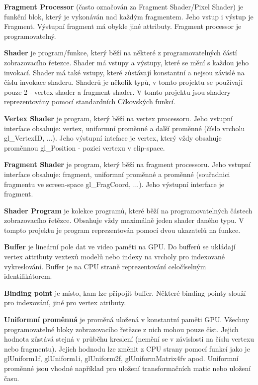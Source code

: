 {\bfseries Fragment Processor} (často označován za Fragment Shader/\-Pixel Shader) je funkční blok, který je vykonáván nad každým fragmentem. Jeho vstup i výstup je Fragment. Výstupní fragment má obykle jiné attributy. Fragment processor je programovatelný.

{\bfseries Shader} je program/funkce, který běží na některé z programovatelných částí zobrazovacího řetezce. Shader má vstupy a výstupy, které se mění s každou jeho invokací. Shader má také vstupy, které zůstávají konstantní a nejsou závislé na číslu invokace shaderu. Shaderů je několik typů, v tomto projektu se používají pouze 2 -\/ vertex shader a fragment shader. V tomto projektu jsou shadery reprezentovány pomocí standardních Cčkovských funkcí.

{\bfseries Vertex Shader} je program, který běží na vertex processoru. Jeho vstupní interface obsahuje\-: vertex, uniformní proměnné a další proměnné (číslo vrcholu gl\-\_\-\-Vertex\-I\-D, ...). Jeho výstupní inteface je vertex, který vždy obsahuje proměnnou gl\-\_\-\-Position -\/ pozici vertexu v clip-\/space.

{\bfseries Fragment Shader} je program, který běží na fragment processoru. Jeho vstupní interface obsahuje\-: fragment, uniformní proměnné a proměnné (souřadnici fragmentu ve screen-\/space gl\-\_\-\-Frag\-Coord, ...). Jeho výstupní interface je fragment.

{\bfseries Shader Program} je kolekce programů, které běží na programovatelných částech zobrazovacího řetězce. Obsahuje vždy maximálně jeden shader daného typu. V tompto projektu je program reprezentován pomocí dvou ukazatelů na funkce. 

{\bfseries Buffer} je lineární pole dat ve video paměti na G\-P\-U. Do bufferů se ukládají vertex attributy vextexů modelů nebo indexy na vrcholy pro indexované vykreslování. Buffer je na C\-P\-U straně reprezentování celočíselným identifikátorem.

{\bfseries Binding point} je místo, kam lze připojit buffer. Některé binding pointy slouží pro indexování, jiné pro vertex atributy.

{\bfseries Uniformní proměnná} je proměná uložená v konstantní paměti G\-P\-U. Všechny programovatelné bloky zobrazovacího řetězce z nich mohou pouze číst. Jejich hodnota zůstává stejná v průběhu kreslení (nemění se v závislosti na číslu vertexu nebo fragmentu). Jejich hodnodu lze změnit z C\-P\-U strany pomocí funkcí jako je gl\-Uniform1f, gl\-Uniform1i, gl\-Uniform2f, gl\-Uniform\-Matrix4fv apod. Uniformní proměnné jsou vhodné například pro uložení transformačních matic nebo uložení času.

